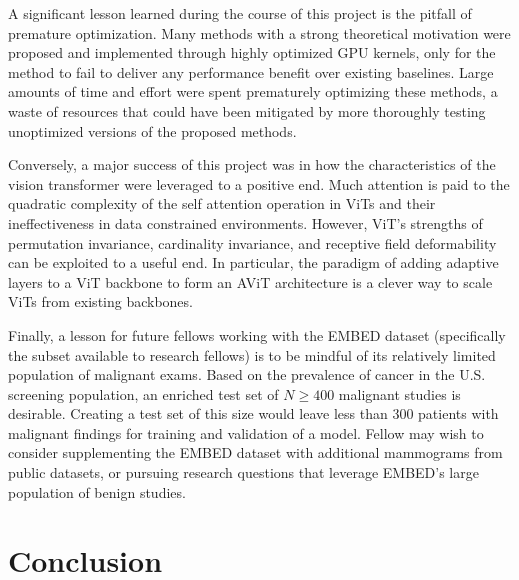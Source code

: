 \documentclass[12pt]{article}
\begin{document}
A significant lesson learned during the course of this project is the pitfall of premature optimization. Many methods with a strong
theoretical motivation were proposed and implemented through highly optimized GPU kernels, only for the method to fail to deliver
any performance benefit over existing baselines. Large amounts of time and effort were spent prematurely optimizing these methods,
a waste of resources that could have been mitigated by more thoroughly testing unoptimized versions of the proposed methods.

Conversely, a major success of this project was in how the characteristics of the vision transformer were leveraged to a positive end. Much attention is paid to the quadratic complexity of the self attention operation in ViTs and their ineffectiveness in data constrained environments. However, ViT's strengths of permutation invariance, cardinality invariance, and receptive field deformability can be exploited to a useful end. In particular, the paradigm of adding adaptive layers to a ViT backbone to form an AViT architecture is a clever way to scale ViTs from existing backbones.

Finally, a lesson for future fellows working with the EMBED dataset (specifically the subset available to research fellows) is to be mindful of its relatively limited population of malignant exams. Based on the prevalence of cancer in the U.S. screening population, an enriched test set of $N \geq 400$ malignant studies is desirable. Creating a test set of this size would leave less than $300$ patients with malignant findings for training and validation of a model. Fellow may wish to consider supplementing the EMBED dataset with additional mammograms from public datasets, or pursuing research questions that leverage EMBED's large population of benign studies.

\section{Conclusion}
\noindent
\end{document}
